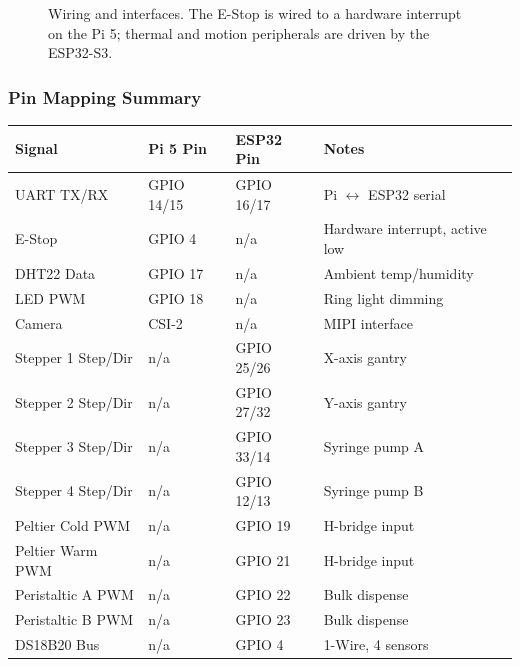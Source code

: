 \documentclass[11pt,letterpaper]{article}
\begin{document}
\begin{figure}[!htbp]
{%
}
\caption{Wiring and interfaces. The E-Stop is wired to a hardware interrupt on the Pi 5; thermal and motion peripherals are driven by the ESP32-S3.}
\label{fig:wiring}
\end{figure}

\subsubsection{Pin Mapping Summary}

\begin{xltabular}{\textwidth}{L{3.6cm} L{2.3cm} L{2.3cm} Y}
\toprule
\textbf{Signal} & \textbf{Pi 5 Pin} & \textbf{ESP32 Pin} & \textbf{Notes} \\
\midrule
\endhead
UART TX/RX & GPIO 14/15 & GPIO 16/17 & Pi $\leftrightarrow$ ESP32 serial \\
E-Stop & GPIO 4 & n/a & Hardware interrupt, active low \\
DHT22 Data & GPIO 17 & n/a & Ambient temp/humidity \\
LED PWM & GPIO 18 & n/a & Ring light dimming \\
Camera & CSI-2 & n/a & MIPI interface \\
Stepper 1 Step/Dir & n/a & GPIO 25/26 & X-axis gantry \\
Stepper 2 Step/Dir & n/a & GPIO 27/32 & Y-axis gantry \\
Stepper 3 Step/Dir & n/a & GPIO 33/14 & Syringe pump A \\
Stepper 4 Step/Dir & n/a & GPIO 12/13 & Syringe pump B \\
Peltier Cold PWM & n/a & GPIO 19 & H-bridge input \\
Peltier Warm PWM & n/a & GPIO 21 & H-bridge input \\
Peristaltic A PWM & n/a & GPIO 22 & Bulk dispense \\
Peristaltic B PWM & n/a & GPIO 23 & Bulk dispense \\
DS18B20 Bus & n/a & GPIO 4 & 1-Wire, 4 sensors \\*
\bottomrule
\end{xltabular}
\end{document}
